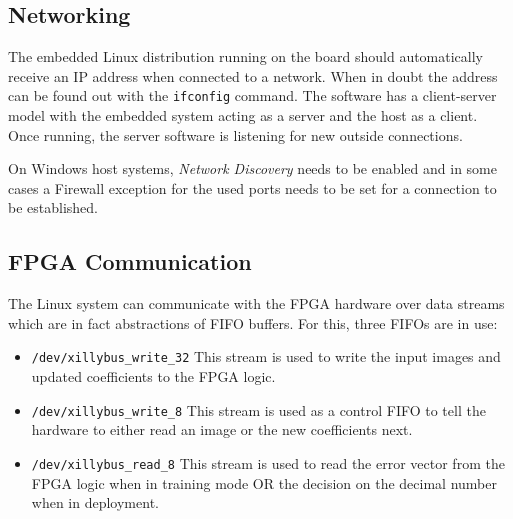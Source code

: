 \documentclass[12pt]{article}
\begin{document}
\subsection{Networking}
The embedded Linux distribution running on the board should automatically receive an IP address when connected to a network. When in doubt the address can be found out with the \verb|ifconfig| command. The software has a client-server model with the embedded system acting as a server and the host as a client. Once running, the server software is listening for new outside connections.

On Windows host systems, \emph{Network Discovery} needs to be enabled and in some cases a Firewall exception for the used ports needs to be set for a connection to be established.
\subsection{FPGA Communication}
The Linux system can communicate with the \ac{FPGA} hardware over data streams which are in fact abstractions of \ac{FIFO} buffers. For this, three \ac{FIFO}s are in use:
\begin{itemize}
	\item \verb|/dev/xillybus_write_32|\newline
	This stream is used to write the input images and updated coefficients to the \ac{FPGA} logic.
	\item \verb|/dev/xillybus_write_8|\newline
	This stream is used as a control \ac{FIFO} to tell the hardware to either read an image or the new coefficients next.
	\item \verb|/dev/xillybus_read_8|\newline
	This stream is used to read the error vector from the \ac{FPGA} logic when in training mode OR the decision on the decimal number when in deployment.
\end{itemize}
\end{document}

